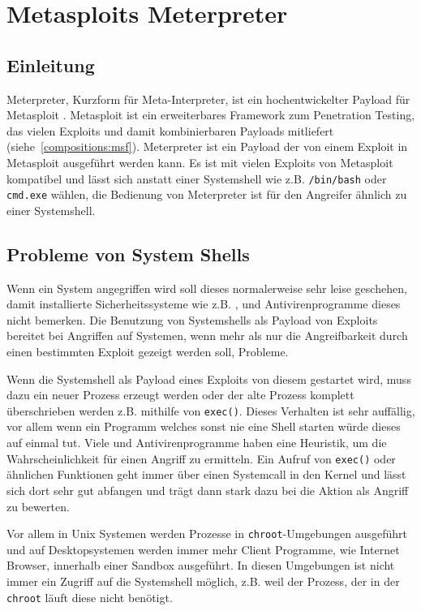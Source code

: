 \section{Metasploits Meterpreter}
\label{compositions:meterpreter}
\authors{\HM}{}

\subsection{Einleitung}

Meterpreter, Kurzform für Meta-Interpreter, ist ein hochentwickelter
Payload für Metasploit \cite{skape-meterpreter}. Metasploit ist ein
erweiterbares Framework zum Penetration Testing, das vielen Exploits
und damit kombinierbaren Payloads mitliefert (siehe~\ref{compositions:msf}).
Meterpreter ist ein Payload der von einem Exploit in Metasploit
ausgeführt werden kann. Es ist mit vielen Exploits von Metasploit
kompatibel und lässt sich anstatt einer Systemshell wie z.B.
\texttt{/bin/bash} oder \texttt{cmd.exe} wählen, die Bedienung von
Meterpreter ist für den Angreifer ähnlich zu einer Systemshell.

\subsection{Probleme von System Shells}
\label{compositions:meterpreter:systemshell}

Wenn ein System angegriffen wird soll dieses normalerweise sehr leise
geschehen, damit installierte Sicherheitssysteme wie z.B. ,
 und Antivirenprogramme dieses nicht bemerken. Die Benutzung
von Systemshells als Payload von Exploits bereitet bei Angriffen auf
Systemen, wenn mehr als nur die Angreifbarkeit durch einen bestimmten
Exploit gezeigt werden soll, Probleme.

Wenn die Systemshell als Payload eines Exploits von diesem gestartet
wird, muss dazu ein neuer Prozess erzeugt werden oder der alte Prozess
komplett überschrieben werden z.B. mithilfe von \texttt{exec()}.
Dieses Verhalten ist sehr auffällig, vor allem wenn ein Programm welches
sonst nie eine Shell starten würde dieses auf einmal tut.
Viele  und Antivirenprogramme haben eine Heuristik, um die
Wahrscheinlichkeit für einen Angriff zu ermitteln. Ein Aufruf von
\texttt{exec()} oder ähnlichen Funktionen geht immer über einen
Systemcall in den Kernel und lässt sich dort sehr gut abfangen und trägt
dann stark dazu bei die Aktion als Angriff zu bewerten.

Vor allem in Unix Systemen werden Prozesse in \texttt{chroot}-Umgebungen
ausgeführt und auf Desktopsystemen werden immer mehr Client Programme,
wie Internet Browser, innerhalb einer Sandbox ausgeführt. In diesen
Umgebungen ist nicht immer ein Zugriff auf die Systemshell möglich,
z.B. weil der Prozess, der in der \texttt{chroot} läuft diese nicht
benötigt.

